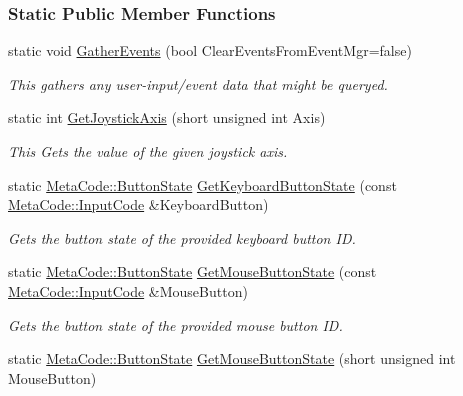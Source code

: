 \subsubsection*{Static Public Member Functions}
\begin{DoxyCompactItemize}
\item 
static void \hyperlink{classphys_1_1InputQueryTool_a9779d812418f1fddb0880df0c607242b}{GatherEvents} (bool ClearEventsFromEventMgr=false)
\begin{DoxyCompactList}\small\item\em This gathers any user-\/input/event data that might be queryed. \item\end{DoxyCompactList}\item 
static int \hyperlink{classphys_1_1InputQueryTool_ae8b922315b271a2eeb376f10a7c97cf4}{GetJoystickAxis} (short unsigned int Axis)
\begin{DoxyCompactList}\small\item\em This Gets the value of the given joystick axis. \item\end{DoxyCompactList}\item 
static \hyperlink{classphys_1_1MetaCode_a2fdfb26b3e50ceb0ccc60bfc4c3d6ac2}{MetaCode::ButtonState} \hyperlink{classphys_1_1InputQueryTool_a457529e30edf8d3cf5ef04ae6a8db506}{GetKeyboardButtonState} (const \hyperlink{classphys_1_1MetaCode_a3e501cbb5bf0f6f1fdb7211465bda8d8}{MetaCode::InputCode} \&KeyboardButton)
\begin{DoxyCompactList}\small\item\em Gets the button state of the provided keyboard button ID. \item\end{DoxyCompactList}\item 
static \hyperlink{classphys_1_1MetaCode_a2fdfb26b3e50ceb0ccc60bfc4c3d6ac2}{MetaCode::ButtonState} \hyperlink{classphys_1_1InputQueryTool_ada22b6ee93632c85f7b7a0490d418382}{GetMouseButtonState} (const \hyperlink{classphys_1_1MetaCode_a3e501cbb5bf0f6f1fdb7211465bda8d8}{MetaCode::InputCode} \&MouseButton)
\begin{DoxyCompactList}\small\item\em Gets the button state of the provided mouse button ID. \item\end{DoxyCompactList}\item 
static \hyperlink{classphys_1_1MetaCode_a2fdfb26b3e50ceb0ccc60bfc4c3d6ac2}{MetaCode::ButtonState} \hyperlink{classphys_1_1InputQueryTool_a1ef8b70af163d8bc703fd16c3fcce22d}{GetMouseButtonState} (short unsigned int MouseButton)

\end{DoxyCompactItemize}
